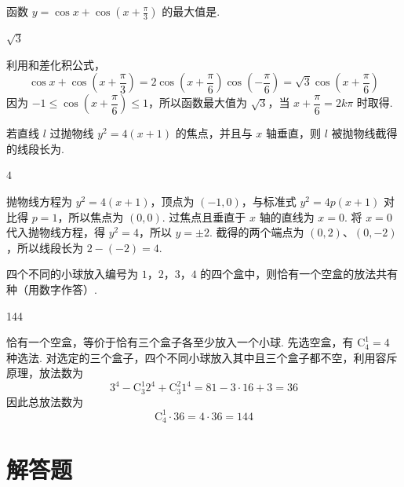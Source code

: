 \begin{problem}
函数 \(y = \cos x + \cos \left(x + \frac{\pi}{3} \right) \) 的最大值是\fillinblank{}.
\end{problem}

\begin{answer}
\(\sqrt{3}\)
\end{answer}

\begin{solution}
利用和差化积公式，
\[
\cos x+\cos\left(x+\frac{\pi}{3}\right)
=2\cos\left(x+\frac{\pi}{6}\right)\cos\left(-\frac{\pi}{6}\right)
=\sqrt3\cos\left(x+\frac{\pi}{6}\right)
\]
因为 \(-1\leqslant\cos\left(x+\dfrac{\pi}{6}\right)\leqslant1\)，所以函数最大值为 \(\sqrt3\)，当 \(x+\dfrac{\pi}{6}=2k\pi\) 时取得.
\end{solution}

\begin{problem}
若直线 \(l\) 过抛物线 \(y^{2}=4(x+1) \) 的焦点，并且与 \(x\) 轴垂直，则 \(l\) 被抛物线截得的线段长为\fillinblank{}.
\end{problem}

\begin{answer}
\(4\)
\end{answer}

\begin{solution}
抛物线方程为 \(y^2=4(x+1)\)，顶点为 \((-1,0)\)，与标准式 \(y^2=4p(x+1)\) 对比得 \(p=1\)，所以焦点为 \((0,0)\). 过焦点且垂直于 \(x\) 轴的直线为 \(x=0\). 将 \(x=0\) 代入抛物线方程，得 \(y^2=4\)，所以 \(y=\pm2\).
截得的两个端点为 \((0,2)\)、\((0,-2)\)，所以线段长为 \(2-(-2)=4\).
\end{solution}

\begin{problem}
四个不同的小球放入编号为 \(1\)，\(2\)，\(3\)，\(4\) 的四个盒中，则恰有一个空盒的放法共有\fillinblank{}种（用数字作答）.
\end{problem}

\begin{answer}
144
\end{answer}

\begin{solution}
恰有一个空盒，等价于恰有三个盒子各至少放入一个小球. 先选空盒，有 \(\mathrm C_4^1=4\) 种选法. 对选定的三个盒子，四个不同小球放入其中且三个盒子都不空，利用容斥原理，放法数为
\[
3^4-\mathrm C_3^1 2^4+\mathrm C_3^2 1^4
=81-3\cdot16+3=36
\]
因此总放法数为
\[
\mathrm C_4^1\cdot36=4\cdot36=144
\]
\end{solution}

\section{解答题}


